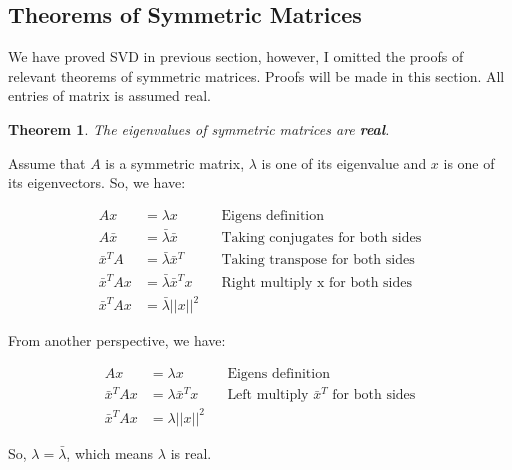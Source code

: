 \documentclass[a4paper]{book}
\newtheorem{theorem}{Theorem}[section]
\newenvironment{proof}[1][Proof]{\begin{trivlist}
\item[\hskip \labelsep {\bfseries #1}]}{\end{trivlist}}
\begin{document}
      \subsection{Theorems of Symmetric Matrices}

      We have proved SVD in previous section, however, I omitted the
      proofs of relevant theorems of symmetric matrices.
      Proofs\cite{richard_some_basic_matrix_theorems} will be made in
      this section. All entries of matrix is assumed real.

      \begin{theorem}
        The eigenvalues of symmetric matrices are \textbf{real}.
      \end{theorem}

      \begin{proof}
        Assume that $A$ is a symmetric matrix, $\lambda$ is one of
        its eigenvalue and $x$ is one of its eigenvectors. So, we have:

        \begin{align*}
          Ax        &= \lambda x
            && \text{Eigens definition}                 \\
          A\bar{x}  &= \bar{\lambda} \bar{x}  
            && \text{Taking conjugates for both sides}  \\
          \bar{x}^{T}A  &= \bar{\lambda} \bar{x}^{T}  
            && \text{Taking transpose for both sides}   \\
          \bar{x}^{T}Ax  &= \bar{\lambda} \bar{x}^{T}x  
            && \text{Right multiply x for both sides}   \\
          \bar{x}^{T}Ax  &= \bar{\lambda} || x ||^{2}  
            &&
        \end{align*}

        From another perspective, we have:

        \begin{align*}
          Ax        &= \lambda x
            && \text{Eigens definition}                           \\
          \bar{x}^{T}Ax        &= \lambda \bar{x}^{T}x
            && \text{Left multiply $\bar{x}^{T}$ for both sides}  \\
          \bar{x}^{T}Ax  &= \lambda || x ||^{2}  
            &&
        \end{align*}

        So, $\lambda = \bar{\lambda}$, which means $\lambda$ is real.
      \end{proof}
\end{document}
